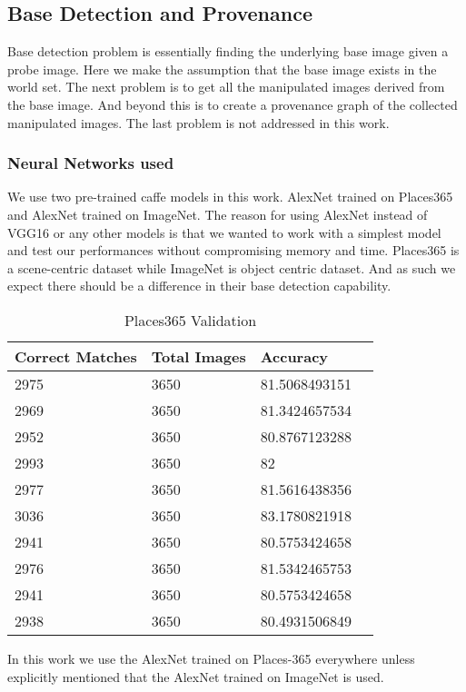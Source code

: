 \documentclass{article}
\begin{document}
\subsection{Base Detection and Provenance}
Base detection problem is essentially finding the underlying base image given a probe image. Here we make the assumption that the base image exists in the world set. The next problem is to get all the manipulated images derived from the base image. And beyond this is to create a provenance graph of the collected manipulated images. The last problem is not addressed in this work.

\subsubsection{Neural Networks used}
We use two pre-trained caffe \cite{jia2014caffe} models in this work. AlexNet\cite{NIPS2012_4824} trained on Places365\cite{zhou2017places} and AlexNet trained on ImageNet. The reason for using AlexNet instead of VGG16 or any other models is that we wanted to work with a simplest model and test our performances without compromising memory and time. Places365 is a scene-centric dataset while ImageNet is object centric dataset. And as such we expect there should be a difference in their base detection capability.
\begin{table}[]
\centering
\caption{Places365 Validation}
\label{p365_val}
\begin{tabular}{|l|l|ll|}
  \hline
  Correct Matches & Total Images & Accuracy  &\\
  \hline
  2975 & 3650 & 81.5068493151 &  \\
  2969 & 3650 & 81.3424657534 &  \\
  2952 & 3650 & 80.8767123288 &  \\
  2993 & 3650 & 82            &  \\
  2977 & 3650 & 81.5616438356 &  \\
  3036 & 3650 & 83.1780821918 &  \\
  2941 & 3650 & 80.5753424658 &  \\
  2976 & 3650 & 81.5342465753 &  \\
  2941 & 3650 & 80.5753424658 &  \\
  2938 & 3650 & 80.4931506849 & \\
  \hline
\end{tabular}
\end{table}

In this work we use the AlexNet trained on Places-365 everywhere unless explicitly mentioned that the AlexNet trained on ImageNet is used.
\end{document}
